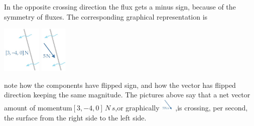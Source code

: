 \documentclass[a4paper,12pt,%
onecolumn,oneside,%
british%
]{memoir}
\renewcommand*{\|}[1][]{\nonscript\:#1\vert\nonscript\:\mathopen{}}
\begin{document}
In the opposite crossing direction the flux gets a minus sign, because of the symmetry of fluxes. The corresponding graphical representation is\noprelistbreak
\begin{center}
  \medskip
  \includegraphics[align=c,height=6em]{images/inv_mflux_NW.jpg}
  \qquad{}\qquad
  \includegraphics[align=c,height=6em]{images/inv_mflux_NW_vec.jpg}
\end{center}
note how the components have flipped sign, and how the vector has flipped direction keeping the same magnitude. The pictures above say that a net vector amount of momentum\enskip$[3, -4, 0]\,\unit{N\,s}$,\enskip or graphically \enskip\enskip\includegraphics[align=c,height=1.5em]{images/inv_mflux_NW_vec_alone.jpg}\ ,\enskip is crossing, per second, the surface from the right side to the left side.
\end{document}

